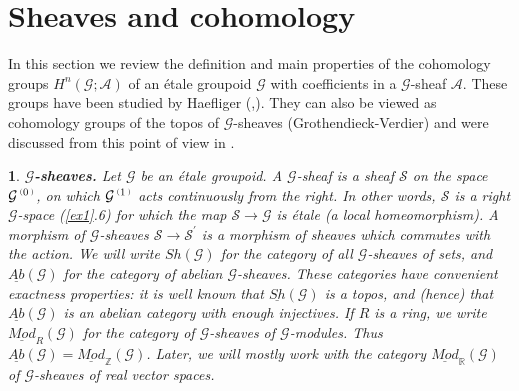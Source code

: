 \documentclass[a4paper]{article}
\newtheorem{num}[st]{}
\newcommand{\rmap}{\longrightarrow}
\newcommand{\G}{\ensuremath{\mathcal{G}}}
\newcommand{\A}{\ensuremath{\mathcal{A}}}
\newcommand{\es}{\ensuremath{\mathcal{S}}}
\newcommand{\shG}{\ensuremath{\underline{Sh}(\G)}}
\newcommand{\abG}{\ensuremath{\underline{Ab}(\G)}}
\newcommand{\mod}{\ensuremath{\underline{Mod}}}
\newcommand{\ps}{{\raise 1pt\hbox{\tiny (}}}
\newcommand{\pd}{{\raise 1pt\hbox{\tiny )}}}
\newcommand{\nG}[1]{\ensuremath{\G^{\,\ps #1\,\pd}}}
\begin{document}
\section{Sheaves and cohomology}


\hspace*{.3in} In this section we review the definition and main properties of the cohomology groups $H^{n}(\G;\A)$ of an \'etale groupoid $\G$ with coefficients in a $\G$-sheaf $\A$. These groups have been studied by Haefliger (\cite{difcoh},\cite{man}). They can also be viewed as cohomology groups of the topos of $\G$-sheaves (Grothendieck-Verdier) and were discussed from this point of view in \cite{Fourier}.





\begin{num}
\emph{
{\bf $\G$-sheaves.} Let $\G$ be an \'etale groupoid. A $\G$-sheaf is a sheaf $\es$ on the space $\nG{0}$, on which $\nG{1}$ acts continuously from the right. In other words, $\es$ is a right $\G$-space (\ref{ex1}.6) for which the map $\es \rmap \G$ is \'etale (a local homeomorphism). A morphism of $\G$-sheaves  $\es \rmap \es^{'}$ is a morphism of sheaves which commutes with the action. We will write $Sh(\G)$ for the category of all $\G$-sheaves of sets, and $\abG$ for the category of abelian $\G$-sheaves. These categories have convenient exactness properties: it is well known that $\shG$ is a topos, and (hence) that $\abG$ is an abelian category with enough injectives. If $R$ is a ring, we write $\mod_{R}(\G)$ for the category of $\G$-sheaves of $\G$-modules. Thus $\abG= \mod_{\mathbb{Z}}(\G)$. Later, we will mostly work with the category $\mod_{\mathbb{R}}(\G)$ of $\G$-sheaves of real vector spaces.
}
\end{num}
\end{document}
